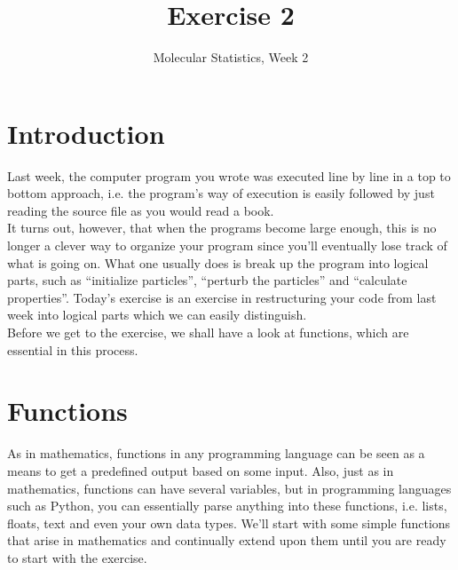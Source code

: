 \documentclass{article}
\title{Exercise 2}
\author{Molecular Statistics, Week 2}
\date{}
\begin{document}

\maketitle

\section{Introduction}


Last week, the computer program you wrote was executed line by line in a top to bottom approach,
i.e. the program's way of execution is easily followed by just reading the source file as you would read a book.\\

It turns out, however, that when the programs become large enough, this is no longer a clever way to organize your program since you'll eventually lose track of what is going on.
What one usually does is break up the program into logical parts, such as “initialize particles”, “perturb the particles” and “calculate properties”.
Today's exercise is an exercise in restructuring your code from last week into logical parts which we can easily distinguish.\\

Before we get to the exercise, we shall have a look at functions, which are essential in this process.\\


\newpage
\section{Functions}





As in mathematics, functions in any programming language can be seen as a means to get a predefined output based on some input.
Also, just as in mathematics, functions can have several variables, but in programming languages
such as Python, you can essentially parse anything into these functions, i.e. lists, floats, text and even your own data types.
We'll start with some simple functions that arise in mathematics and continually extend upon them until you are ready to start with the exercise.\\
\end{document}
